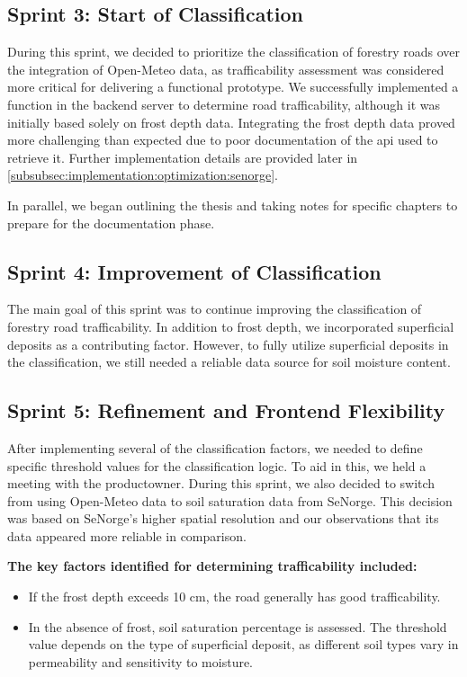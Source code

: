 \subsection*{Sprint 3: Start of Classification}

During this sprint, we decided to prioritize the classification of forestry roads over the integration of Open-Meteo data, as trafficability assessment was considered more critical for delivering a functional prototype. We successfully implemented a function in the backend server to determine road trafficability, although it was initially based solely on frost depth data. Integrating the frost depth data proved more challenging than expected due to poor documentation of the \acrshort{api} used to retrieve it. Further implementation details are provided later in \autoref{subsubsec:implementation:optimization:senorge}.

In parallel, we began outlining the thesis and taking notes for specific chapters to prepare for the documentation phase.

\subsection*{Sprint 4: Improvement of Classification}

The main goal of this sprint was to continue improving the classification of forestry road trafficability. In addition to frost depth, we incorporated superficial deposits as a contributing factor. However, to fully utilize superficial deposits in the classification, we still needed a reliable data source for soil moisture content.

\subsection*{Sprint 5: Refinement and Frontend Flexibility}

After implementing several of the classification factors, we needed to define specific threshold values for the classification logic. To aid in this, we held a meeting with the \gls{productowner}. During this sprint, we also decided to switch from using Open-Meteo data to soil saturation data from SeNorge. This decision was based on SeNorge's higher spatial resolution and our observations that its data appeared more reliable in comparison.

\textbf{The key factors identified for determining trafficability included:}

\begin{itemize}
    \item If the frost depth exceeds 10 cm, the road generally has good trafficability.
    \item In the absence of frost, soil saturation percentage is assessed. The threshold value depends on the type of superficial deposit, as different soil types vary in permeability and sensitivity to moisture.
\end{itemize}

